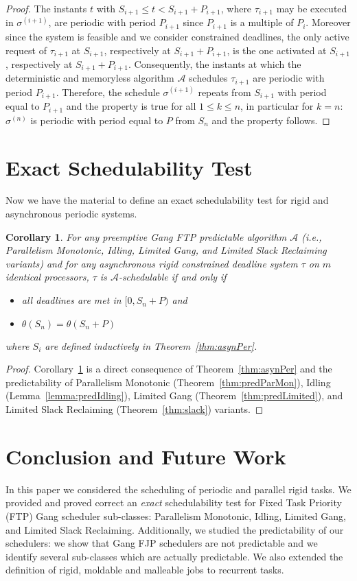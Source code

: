 \documentclass[a4paper]{article}
\newtheorem{corollary}[theorem]{Corollary}
\begin{document}
\begin{proof}
The instants $t$ with $S_{i+1} \leq t < S_{i+1}+P_{i+1}$, where $\tau_{i+1}$ may be executed in $\sigma^{(i+1)}$, are periodic with period $P_{i+1}$ since $P_{i+1}$ is a multiple of $P_i$.  Moreover since the system is feasible and we consider constrained deadlines, the only active request of $\tau_{i+1}$ at $S_{i+1}$, respectively at $S_{i+1}+P_{i+1}$, is the one activated at $S_{i+1}$, respectively at $S_{i+1}+P_{i+1}$. Consequently, the instants at which the deterministic and memoryless algorithm $\mathcal{A}$ schedules $\tau_{i+1}$ are periodic with period $P_{i+1}$. Therefore, the schedule $\sigma^{(i+1)}$ repeats from $S_{i+1}$ with period equal to $P_{i+1}$ and the property is true for all $1 \leq k \leq n$, in particular for $k=n:$ $\sigma^{(n)}$ is periodic with period equal to $P$ from $S_n$ and the property follows.
\end{proof}

\section{Exact Schedulability Test}\label{sec:exact}
Now we have the material to define an exact schedulability test for rigid and asynchronous  periodic systems.

\begin{corollary}\label{cor:exact-test} For any preemptive Gang FTP predictable algorithm $\mathcal{A}$ (i.e., Parallelism Monotonic, Idling, Limited Gang, and Limited Slack Reclaiming variants) and for any asynchronous rigid constrained deadline system $\tau$ on $m$ identical processors, $\tau$ is $\mathcal{A}$-schedulable if and only if 
\begin{itemize}
\item all deadlines are met in $[0, S_n+P)$ and
\item $\theta(S_{n})=\theta(S_{n}+P)$
\end{itemize}
where $S_i$ are defined inductively in Theorem~\ref{thm:asynPer}.
\end{corollary}
\begin{proof}
Corollary~\ref{cor:exact-test} is a direct consequence of Theorem~\ref{thm:asynPer} and the predictability of Parallelism Monotonic (Theorem~\ref{thm:predParMon}), Idling (Lemma~\ref{lemma:predIdling}), Limited Gang (Theorem~\ref{thm:predLimited}), and Limited Slack Reclaiming (Theorem~\ref{thm:slack}) variants.
\end{proof}

\section{Conclusion and Future Work}\label{sec:conclusion}
In this paper we considered the scheduling of periodic and parallel rigid tasks. We provided and proved correct an \emph{exact} schedulability test for Fixed Task Priority (FTP) Gang scheduler sub-classes: Parallelism Monotonic, Idling, Limited Gang, and Limited Slack Reclaiming. Additionally, we studied the predictability of our schedulers: we show that Gang FJP schedulers are not predictable and we identify several sub-classes which are actually predictable. We also extended the definition of rigid, moldable and malleable jobs to recurrent tasks. 
\end{document}
